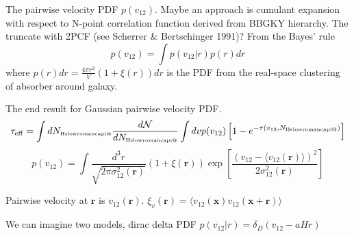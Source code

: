 \documentclass[useAMS,usenatbib,twocolumn]{mn2e}
\makeatletter
\newcommand{\Rmnum}[1]{\expandafter\@slowromancap\romannumeral #1@}
\newcommand{\NHI}{N_{\mbox{\tiny H\Rmnum{1}}}}
\makeatother
\begin{document}
The pairwise velocity PDF $p(v_{12})$. Maybe an approach is cumulant
expansion with respect to N-point correlation function derived from 
BBGKY hierarchy. The truncate with 2PCF (see Scherrer \& Bertschinger 1991)? 
From the Bayes' rule 
\begin{equation}
p(v_{12})=\int p(v_{12}|r)p(r)dr
\end{equation}
where $p(r)dr=\frac{4\pi r^2}{V}(1+\xi(r))dr$ is the PDF from the 
real-space clustering of absorber around galaxy.

The end result for Gaussian pairwise velocity PDF.
\begin{equation}
\tau_{\rm{eff}}=\int d\NHI\frac{d\mathcal{N}}{d\NHI}
\int dv p(v_{12})\left[1-e^{-\tau(v_{12},\NHI)}\right]
\end{equation}
\begin{equation}
p(v_{12})=\int \frac{d^3r}{\sqrt{2\pi\sigma_{12}^2(\boldsymbol{r})}}
\left(1+\xi(\boldsymbol{r})\right)
\exp\left[\frac{(v_{12}-\langle v_{12}(\boldsymbol{r})\rangle)^2}
{2\sigma_{12}^2(\boldsymbol{r})}\right]
\end{equation}

Pairwise velocity at $\boldsymbol{r}$ is $v_{12}(\boldsymbol{r})$.
$\xi_v(\boldsymbol{r})=\langle v_{12}(\boldsymbol{x})
v_{12}(\boldsymbol{x}+\boldsymbol{r})\rangle$

We can imagine two models, dirac delta PDF $p(v_{12}|r)=\delta_D(v_{12}-aHr)$
\end{document}
